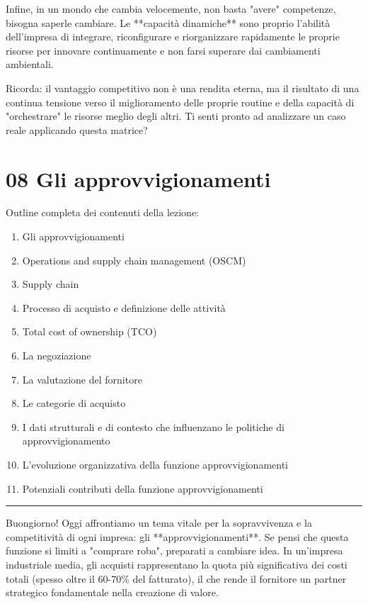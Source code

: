 \documentclass[a4paper,10pt]{article}
\begin{document}
Infine, in un mondo che cambia velocemente, non basta "avere" competenze, bisogna saperle cambiare. Le **capacità dinamiche** sono proprio l'abilità dell'impresa di integrare, riconfigurare e riorganizzare rapidamente le proprie risorse per innovare continuamente e non farsi superare dai cambiamenti ambientali.

Ricorda: il vantaggio competitivo non è una rendita eterna, ma il risultato di una continua tensione verso il miglioramento delle proprie routine e della capacità di "orchestrare" le risorse meglio degli altri. Ti senti pronto ad analizzare un caso reale applicando questa matrice?

\section*{08 Gli approvvigionamenti}

Outline completa dei contenuti della lezione:
{\small
\begin{enumerate}
\item Gli approvvigionamenti
\item Operations and supply chain management (OSCM)
\item Supply chain
\item Processo di acquisto e definizione delle attività
\item Total cost of ownership (TCO)
\item La negoziazione
\item La valutazione del fornitore
\item Le categorie di acquisto
\item I dati strutturali e di contesto che influenzano le politiche di approvvigionamento
\item L’evoluzione organizzativa della funzione approvvigionamenti
\item Potenziali contributi della funzione approvvigionamenti
\end{enumerate}
}
\hrule
\vspace{0.5cm}

Buongiorno! Oggi affrontiamo un tema vitale per la sopravvivenza e la competitività di ogni impresa: gli **approvvigionamenti**. Se pensi che questa funzione si limiti a "comprare roba", preparati a cambiare idea. In un'impresa industriale media, gli acquisti rappresentano la quota più significativa dei costi totali (spesso oltre il 60-70\% del fatturato), il che rende il fornitore un partner strategico fondamentale nella creazione di valore.
\end{document}
